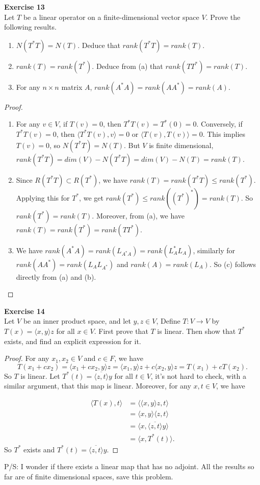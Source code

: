 \documentclass[12pt, a4paper]{article}
\theoremstyle{plain}
\newenvironment{exercise}[2][Exercise]
    { \begin{mdframed}[backgroundcolor=gray!20] \textbf{#1 #2} \\}
    {  \end{mdframed}}
\begin{document}
\begin{exercise}{13}
Let $T$ be a linear operator on a finite-dimensional vector space $V$. Prove the following results.
\begin{enumerate}[label=(\alph*)]
\item $N(T^*T) = N(T)$. Deduce that $rank(T^*T)=rank(T)$.
\item $rank(T)=rank(T^*)$. Deduce from (a) that $rank(TT^*)=rank(T)$.
\item For any $n\times n$ matrix $A$, $rank(A^*A)=rank(AA^*)=rank(A)$.
\end{enumerate}
\end{exercise}
	\begin{proof}
	\hfill
	\begin{enumerate}[label=(\alph*)]
	\item For any $v\in V$, if $T(v)=0$, then $T^*T(v)=T^*(0)=0$. Conversely, if $T^*T(v)=0$, then $\langle{T^*T(v),v}\rangle = 0$ or $\langle{T(v),T(v)}\rangle = 0$. This implies $T(v)=0$, so $N(T^*T) = N(T)$. But $V$ is finite dimensional, $rank(T^*T)= dim(V)-N(T^*T)=dim(V) - N(T) = rank(T)$.
	\item Since $R(T^*T)\subset R(T^*)$, we have $rank(T) = rank(T^*T)\leq rank(T^*)$. Applying this for $T^*$, we get $rank(T^*)\leq rank((T^*)^*)=rank(T)$. So $rank(T^*)=rank(T)$. Moreover, from (a), we have $rank(T)=rank(T^*)=rank(TT^*)$.
	\item We have $rank(A^*A)=rank(L_{A^*A})=rank(L_A^*L_A)$, similarly for $rank(AA^*)=rank(L_AL_{A^*})$ and $rank(A)=rank(L_A)$. So (c) follows directly from (a) and (b).
	\end{enumerate}
	\end{proof}

\begin{exercise}{14}
Let $V$ be an inner product space, and let $y,z\in V$, Define $T:V\rightarrow V$ by $T(x)=\langle{x,y}\rangle z$ for all $x\in V$. First prove that $T$ is linear. Then show that $T^*$ exists, and find an explicit expression for it.
\end{exercise}
	\begin{proof}
	For any $x_1,x_2\in V$ and $c\in F$, we have 
	\[
	T(x_1+cx_2)=\langle{x_1+cx_2,y}\rangle z = \langle{x_1,y}\rangle z+c\langle{x_2,y }\rangle z = T(x_1)+cT(x_2).
	\]
	So $T$ is linear. Let $T^*(t) = \overline{\langle{z,t}\rangle}y$ for all $t\in V$, it's not hard to check, with a similar argument, that this map is linear. Moreover, for any $x,t\in V$, we have
	
	\begin{align*}
	\langle{T(x),t}\rangle &= \langle{\langle{x,y}\rangle z, t}\rangle\\
	&= \langle{x,y}\rangle \langle{z,t}\rangle\\
	&=\langle{x,\overline{\langle{z,t}\rangle}y}\rangle\\
	&=\langle{x,T^*(t)}\rangle.	
	\end{align*}
	So $T^*$ exists and $T^*(t) = \overline{\langle{z,t}\rangle}y$.
	\end{proof}
P/S: I wonder if there exists a linear map that has no adjoint. All the results so far are of finite dimensional spaces, save this problem.
	
\end{document}
